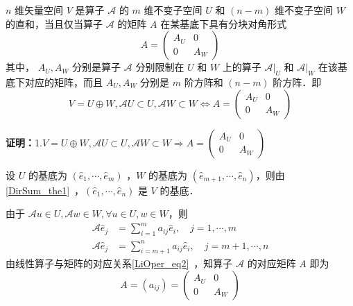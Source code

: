 
\begin{theorem}{}\label{InvSP_the1}
$n$ 维矢量空间 $V$ 是算子 $\mathcal{A}$ 的 $m$ 维不变子空间 $U$ 和 $(n-m)$ 维不变子空间 $W$ 的直和，当且仅当算子 $\mathcal{A}$ 的矩阵 $A$ 在某基底下具有分块对角形式
\begin{equation}\label{InvSP_eq1}
A=\begin{pmatrix}
A_U&0\\
0&A_W
\end{pmatrix}
\end{equation}
其中， $A_U,A_W$ 分别是算子 $\mathcal{A}$ 分别限制在 $U$ 和 $W$ 上的算子 $\mathcal{A}|_U$ 和 $\mathcal{A}|_W$ 在该基底下对应的矩阵，而且 $A_U,A_W$ 分别是 $m$ 阶方阵和 $(n-m)$ 阶方阵．即
\begin{equation}
V=U\oplus W,\mathcal{A}U\subset U,\mathcal{A}W\subset W\Leftrightarrow A=\begin{pmatrix}
A_U&0\\
0&A_W
\end{pmatrix}
\end{equation}

\end{theorem}

\textbf{证明：}1.$
V=U\oplus W,\mathcal{A}U\subset U,\mathcal{A}W\subset W\Rightarrow A=\begin{pmatrix}
A_U&0\\
0&A_W
\end{pmatrix}
$

设 $U$ 的基底为 $(\hat e_1,\cdots,\hat e_m)$ ，$W$ 的基底为 $(\hat e_{m+1},\cdots,\hat e_n)$，则由\autoref{DirSum_the1}~，$(\hat e_{1},\cdots,\hat e_n)$ 是 $V$ 的基底．

由于 $\mathcal{A}u\in U, \mathcal{A} w\in W,\forall  u\in U, w\in W$，则
\begin{equation}\label{InvSP_eq2}
\begin{aligned}
\mathcal{A}\hat e_j&=\sum_{i=1}^m a_{ij}\hat e_i,\quad j=1,\cdots ,m\\
\mathcal{A}\hat e_j&=\sum_{i=m+1}^n a_{ij}\hat e_i,\quad j=m+1,\cdots ,n
\end{aligned}
\end{equation}
由线性算子与矩阵的对应关系\autoref{LiOper_eq2}~，知算子 $\mathcal{A}$ 的对应矩阵 $A$ 即为 
\begin{equation}
A=(a_{ij})=\begin{pmatrix}
A_U&0\\
0&A_W
\end{pmatrix}
\end{equation}

